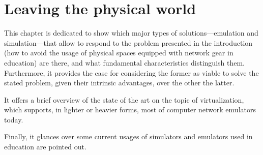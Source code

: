 
\chapter{Leaving the physical world}
\label{ch:leavingthephysicalworld}

This chapter is dedicated to show which major types of solutions---emulation and simulation---that allow to respond to the problem presented in the introduction (how to avoid the usage of physical spaces equipped with network gear in education) are there, and what fundamental characteristics distinguish them.
Furthermore, it provides the case for considering the former as viable to solve the stated problem, given their intrinsic advantages, over the other the latter.

It offers a brief overview of the state of the art on the topic of virtualization, which supports, in lighter or heavier forms, most of computer network emulators today.

Finally, it glances over some current usages of simulators and emulators used in education are pointed out.







